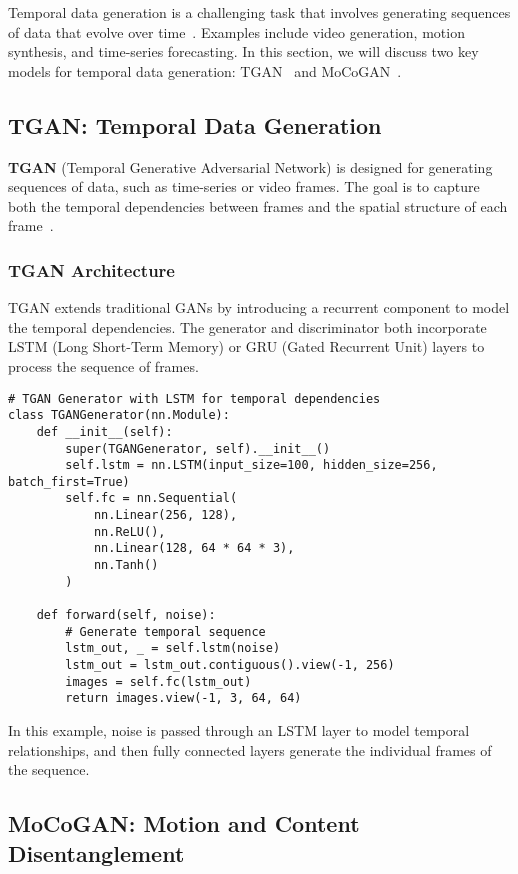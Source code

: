 Temporal data generation is a challenging task that involves generating sequences of data that evolve over time~\cite{saito2017temporal}. Examples include video generation, motion synthesis, and time-series forecasting. In this section, we will discuss two key models for temporal data generation: TGAN~\cite{saito2017temporal} and MoCoGAN~\cite{tulyakov2017mocogan}.

\subsection{TGAN: Temporal Data Generation}

\textbf{TGAN} (Temporal Generative Adversarial Network) is designed for generating sequences of data, such as time-series or video frames. The goal is to capture both the temporal dependencies between frames and the spatial structure of each frame~\cite{saito2017temporal}.

\subsubsection{TGAN Architecture}

TGAN extends traditional GANs by introducing a recurrent component to model the temporal dependencies. The generator and discriminator both incorporate LSTM (Long Short-Term Memory) or GRU (Gated Recurrent Unit) layers to process the sequence of frames.

\begin{lstlisting}[style=python]
# TGAN Generator with LSTM for temporal dependencies
class TGANGenerator(nn.Module):
    def __init__(self):
        super(TGANGenerator, self).__init__()
        self.lstm = nn.LSTM(input_size=100, hidden_size=256, batch_first=True)
        self.fc = nn.Sequential(
            nn.Linear(256, 128),
            nn.ReLU(),
            nn.Linear(128, 64 * 64 * 3),
            nn.Tanh()
        )

    def forward(self, noise):
        # Generate temporal sequence
        lstm_out, _ = self.lstm(noise)
        lstm_out = lstm_out.contiguous().view(-1, 256)
        images = self.fc(lstm_out)
        return images.view(-1, 3, 64, 64)
\end{lstlisting}

In this example, noise is passed through an LSTM layer to model temporal relationships, and then fully connected layers generate the individual frames of the sequence.

\subsection{MoCoGAN: Motion and Content Disentanglement}

